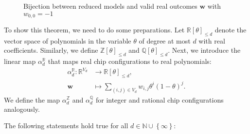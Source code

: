 \begin{figure}[H]
    \centering
    \caption{Bijection between reduced models and valid real outcomes \( \mathbf w \) with \( w_{0,0} = -1 \)}
\end{figure}


To show this theorem, we need to do some preparations. Let \( \mathbb{R}[\theta]_{\leq d} \) denote the vector space of polynomials in the variable \( \theta \) of degree at most \( d \) with real coefficients. Similarly, we define \( \mathbb{Z}[\theta]_{\leq d} \) and \( \mathbb{Q}[\theta]_{\leq d} \). Next, we introduce the linear map \( \alpha_{d}^{\mathbb R} \) that maps real chip configurations to real polynomials:
\begin{align*}
    \alpha_d^{\mathbb R}: \mathbb{R}^{V_d} &\to \mathbb{R}[\theta]_{\leq d}, \\
    \mathbf{w} &\mapsto \sum_{(i,j) \in V_d} w_{i,j} \theta^{i}(1-\theta)^j.
\end{align*}
We define the map \( \alpha_d^{\mathbb Z} \) and \( \alpha_d^{\mathbb Q} \) for integer and rational chip configurations analogously.

\begin{lemma}\label{lem:kernel-noo}
    The following statements hold true for all \( d \in \mathbb{N} \cup \left\{ \infty \right\} \):
\end{lemma}

